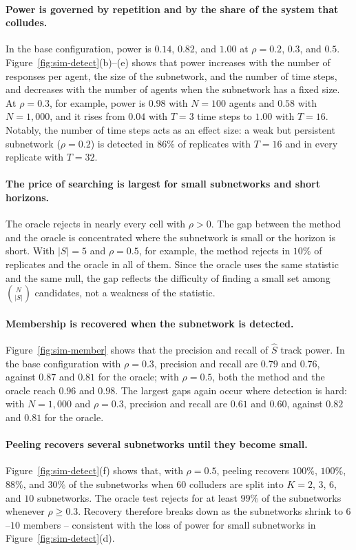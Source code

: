 \documentclass{article}
\theoremstyle{plain}
\theoremstyle{definition}
\begin{document}
\paragraph{Power is governed by repetition and by the share of the system that colludes.} In the base configuration, power is $0.14$, $0.82$, and $1.00$ at $\rho=0.2$, $0.3$, and $0.5$. Figure~\ref{fig:sim-detect}(b)--(e) shows that power increases with the number of responses per agent, the size of the subnetwork, and the number of time steps, and decreases with the number of agents when the subnetwork has a fixed size. At $\rho=0.3$, for example, power is $0.98$ with $N=100$ agents and $0.58$ with $N=1{,}000$, and it rises from $0.04$ with $T=3$ time steps to $1.00$ with $T=16$. Notably, the number of time steps acts as an effect size: a weak but persistent subnetwork ($\rho=0.2$) is detected in $86\%$ of replicates with $T=16$ and in every replicate with $T=32$.

\paragraph{The price of searching is largest for small subnetworks and short horizons.} The oracle rejects in nearly every cell with $\rho>0$. The gap between the method and the oracle is concentrated where the subnetwork is small or the horizon is short. With $|S|=5$ and $\rho=0.5$, for example, the method rejects in $10\%$ of replicates and the oracle in all of them. Since the oracle uses the same statistic and the same null, the gap reflects the difficulty of finding a small set among $\binom{N}{|S|}$ candidates, not a weakness of the statistic.

\paragraph{Membership is recovered when the subnetwork is detected.} Figure~\ref{fig:sim-member} shows that the precision and recall of $\hat S$ track power. In the base configuration with $\rho=0.3$, precision and recall are $0.79$ and $0.76$, against $0.87$ and $0.81$ for the oracle; with $\rho=0.5$, both the method and the oracle reach $0.96$ and $0.98$. The largest gaps again occur where detection is hard: with $N=1{,}000$ and $\rho=0.3$, precision and recall are $0.61$ and $0.60$, against $0.82$ and $0.81$ for the oracle.

\paragraph{Peeling recovers several subnetworks until they become small.} Figure~\ref{fig:sim-detect}(f) shows that, with $\rho=0.5$, peeling recovers $100\%$, $100\%$, $88\%$, and $30\%$ of the subnetworks when $60$ colluders are split into $K=2$, $3$, $6$, and $10$ subnetworks. The oracle test rejects for at least $99\%$ of the subnetworks whenever $\rho\ge 0.3$. Recovery therefore breaks down as the subnetworks shrink to $6$--$10$ members -- consistent with the loss of power for small subnetworks in Figure~\ref{fig:sim-detect}(d).
\end{document}
